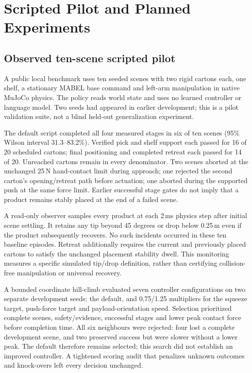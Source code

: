 \section{Scripted Pilot and Planned Experiments}
\subsection{Observed ten-scene scripted pilot}
A public local benchmark uses ten seeded scenes with two rigid cartons each,
one shelf, a stationary MABEL base command and left-arm manipulation in native
MuJoCo physics. The policy reads world state and uses no learned controller or
language model. Two seeds had appeared in earlier development; this is a pilot
validation suite, not a blind held-out generalization experiment.

The default script completed all four measured stages in six of ten scenes
(95\% Wilson interval 31.3--83.2\%). Verified pick and shelf support each passed
for 16 of 20 scheduled cartons; final positioning and completed retreat each
passed for 14 of 20. Unreached cartons remain in every denominator. Two scenes
aborted at the unchanged 25\,N hand-contact limit during approach; one rejected
the second carton's opening/retreat path before actuation; one aborted during
the supported push at the same force limit. Earlier successful stage gates do
not imply that a product remains stably placed at the end of a failed scene.

A read-only observer samples every product at each 2\,ms physics step after
initial scene settling. It retains any tip beyond 45 degrees or drop below
0.25\,m even if the product subsequently recovers. No such incidents occurred
in these ten baseline episodes. Retreat additionally requires the current and
previously placed cartons to satisfy the unchanged placement stability dwell.
This monitoring measures a specific simulated tip/drop definition, rather than
certifying collision-free manipulation or universal recovery.

A bounded coordinate hill-climb evaluated seven controller configurations on
two separate development seeds: the default, and 0.75/1.25 multipliers for the
squeeze target, push-force target and payload-orientation speed. Selection
prioritized complete scenes, safety/evidence, successful stages and lower
peak contact force before completion time. All six neighbours were rejected:
four lost a complete development scene, and two preserved success but were
slower without a lower peak. The default therefore remains selected; this
search did not establish an improved controller. A tightened scoring audit
that penalizes unknown outcomes and knock-overs left every decision unchanged.


